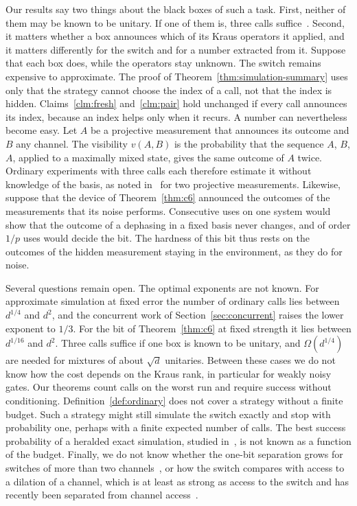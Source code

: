 \documentclass[11pt,letterpaper]{article}
\theoremstyle{definition}\newtheorem{definition}[theorem]{Definition}
\begin{document}
Our results say two things about the black boxes of such a task. First,
neither of them may be known to be unitary. If one of them is, three calls
suffice~\cite[Theorem~1]{bavaresco2025}. Second, it matters whether a box announces which of its
Kraus operators it applied, and it matters differently for the switch
and for a number extracted from it. Suppose that each box does, while
the operators stay unknown. The switch remains expensive to
approximate. The proof of Theorem~\ref{thm:simulation-summary} uses
only that the strategy cannot choose the index of a call, not that the
index is hidden. Claims~\ref{clm:fresh} and~\ref{clm:pair} hold
unchanged if every call announces its index, because an index helps
only when it recurs. A number can nevertheless become easy. Let $A$ be
a projective measurement that announces its outcome and $B$ any
channel. The visibility $v(A,B)$ is the probability that the sequence
$A$, $B$, $A$, applied to a maximally mixed state, gives the same
outcome of $A$ twice. Ordinary experiments with three calls each
therefore estimate it without knowledge of the basis, as noted
in~\cite{gao2023} for two projective measurements. Likewise, suppose
that the device of Theorem~\ref{thm:c6} announced the outcomes of the
measurements that its noise performs. Consecutive uses on one system
would show that the outcome of a dephasing in a fixed basis never
changes, and of order $1/p$ uses would decide the bit. The hardness of
this bit thus rests on the outcomes of the hidden measurement staying
in the environment, as they do for noise.

Several questions remain open. The optimal exponents are not known. For
approximate simulation at fixed error the number of ordinary calls lies
between $d^{1/4}$ and $d^2$, and the concurrent work of
Section~\ref{sec:concurrent} raises the lower exponent to $1/3$. For
the bit of Theorem~\ref{thm:c6} at fixed strength it lies between $d^{1/16}$ and $d^2$. Three calls suffice if one box is known to be unitary,
and $\Omega(d^{1/4})$ are needed for mixtures of about $\sqrt d$
unitaries. Between these cases we do not know how the cost depends
on the Kraus rank, in particular for weakly noisy gates. Our theorems
count calls on the worst run and require success without conditioning.
Definition~\ref{def:ordinary} does not cover a strategy without a
finite budget. Such a strategy might still simulate the switch exactly
and stop with probability one, perhaps with a finite expected number of
calls. The best success probability of a heralded exact simulation,
studied in~\cite{bavaresco2025}, is not known as a function of the
budget. Finally, we do not know whether the one-bit separation grows
for switches of more than two
channels~\cite{araujo2014,colnaghi2012}, or how the switch compares
with access to a dilation of a channel, which is at least as strong as
access to the switch and has recently been separated from channel
access~\cite{goldin2026,arihara2026}.
\end{document}
